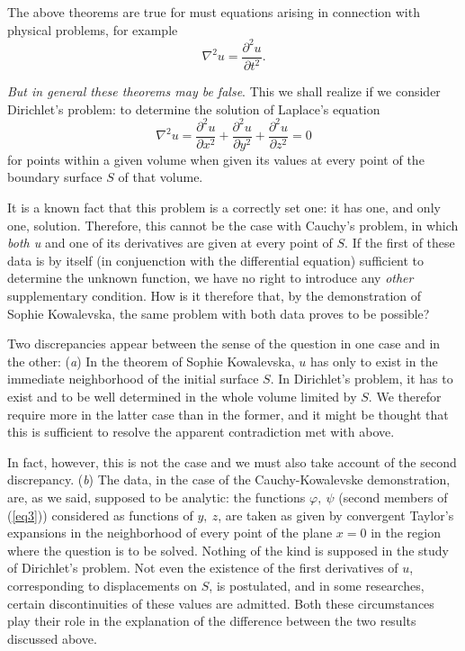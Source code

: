 \documentclass[12pt,oneside]{book}
\begin{document}
The above theorems are true for must equations arising in connection with physical problems, for example
\begin{equation}
    \tag{E}\label{E}
    \nabla^2u=\frac{\partial^2u}{\partial t^2}.
\end{equation} \par

\textit{But in general these theorems may be false}. This we shall realize if we consider Dirichlet's problem: to determine the solution of Laplace's equation
\begin{equation}
    \tag{e}\label{e}
    \nabla^2u=\frac{\partial^2u}{\partial x^2}+\frac{\partial^2u}{\partial y^2}+\frac{\partial^2u}{\partial z^2}=0
\end{equation}
for points within a given volume when given its values at every point of the boundary surface $S$ of that volume. \par

It is a known fact that this problem is a correctly set one: it has one, and only one, solution. Therefore, this cannot be the case with Cauchy's problem, in which \textit{both u} and one of its derivatives are given at every point of $S$. If the first of these data is by itself (in conjuenction with the differential equation) sufficient to determine the unknown function, we have no right to introduce any \textit{other} supplementary condition. How is it therefore that, by the demonstration of Sophie Kowalevska, the same problem with both data proves to be possible? \par

Two discrepancies appear between the sense of the question in one case and in the other: (\textit{a}) In the theorem of Sophie Kowalevska, $u$ has only to exist in the immediate neighborhood of the initial surface $S$. In Dirichlet's problem, it has to exist and to be well determined in the whole volume limited by $S$. We therefor require more in the latter case than in the former, and it might be thought that this is sufficient to resolve the apparent contradiction met with above. \par

In fact, however, this is not the case and we must also take account of the second discrepancy. (\textit{b}) The data, in the case of the Cauchy-Kowalevske demonstration, are, as we said, supposed to be analytic: the functions $\varphi,\ \psi$ (second members of (\ref{eq3})) considered as functions of $y,\ z$, are taken as given by convergent Taylor's expansions in the neighborhood of every point of the plane $x=0$ in the region where the question is to be solved. Nothing of the kind is supposed in the study of Dirichlet's problem. Not even the existence of the first derivatives of $u$, corresponding to displacements on $S$, is postulated, and in some researches, certain discontinuities of these values are admitted. Both these circumstances play their role in the explanation of the difference between the two results discussed above. \par
\end{document}
